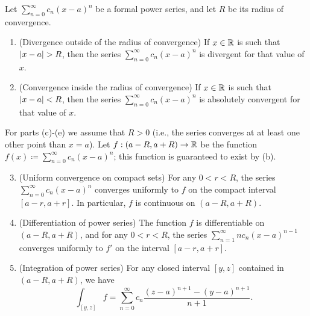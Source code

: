 \setcounter{thm}{5}
\begin{thm}\label{ii:4.1.6}
  Let \(\sum_{n = 0}^\infty c_n (x - a)^n\) be a formal power series, and let \(R\) be its radius of convergence.
  \begin{enumerate}
    \item\label{ii:4.1.6.a} (Divergence outside of the radius of convergence)
    If \(x \in \mathbb{R}\) is such that \(\left\lvert x - a\right\rvert > R\), then the series \(\sum_{n = 0}^\infty c_n (x - a)^n\) is divergent for that value of \(x\).
    \item\label{ii:4.1.6.b} (Convergence inside the radius of convergence)
    If \(x \in \mathbb{R}\) is such that \(\left\lvert x - a\right\rvert < R\), then the series \(\sum_{n = 0}^\infty c_n (x - a)^n\) is absolutely convergent for that value of \(x\).
  \end{enumerate}
  For parts (c)-(e) we assume that \(R > 0\)
  (i.e., the series converges at at least one other point than \(x = a\)).
  Let \(f : (a - R, a + R) \to \mathbb{R}\) be the function \(f(x) \coloneqq \sum_{n = 0}^\infty c_n (x - a)^n\);
  this function is guaranteed to exist by (b).
  \begin{enumerate}
    \setcounter{enumi}{2}
    \item\label{ii:4.1.6.c} (Uniform convergence on compact sets)
    For any \(0 < r < R\), the series \(\sum_{n = 0}^\infty c_n (x - a)^n\) converges uniformly to \(f\) on the compact interval \([a - r, a + r]\).
    In particular, \(f\) is continuous on \((a - R, a + R)\).
    \item\label{ii:4.1.6.d} (Differentiation of power series)
    The function \(f\) is differentiable on \((a - R, a + R)\), and for any \(0 < r < R\), the series \(\sum_{n = 1}^\infty n c_n (x - a)^{n - 1}\) converges uniformly to \(f'\) on the interval \([a - r, a + r]\).
    \item\label{ii:4.1.6.e} (Integration of power series)
    For any closed interval \([y, z]\) contained in \((a - R, a + R)\), we have
    \[
      \int_{[y, z]} f = \sum_{n = 0}^\infty c_n \dfrac{(z - a)^{n + 1} - (y - a)^{n + 1}}{n + 1}.
    \]
  \end{enumerate}
\end{thm}

